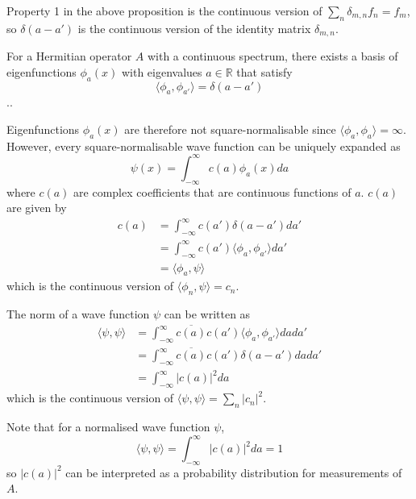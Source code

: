 \begin{remark}
	Property 1 in the above proposition is the continuous version of $\sum_n \delta_{m, n} f_n = f_m$, so $\delta(a - a')$ is the continuous version of the identity matrix $\delta_{m, n}$.
\end{remark}

\begin{proposition}
	For a Hermitian operator $A$ with a continuous spectrum, there exists a basis of eigenfunctions $\phi_a(x)$ with eigenvalues $a \in \mathbb{R}$ that satisfy
	\[
		\langle \phi_a, \phi_{a'} \rangle = \delta(a - a')
	\]..
\end{proposition}

\begin{corollary}
	Eigenfunctions $\phi_a(x)$ are therefore not square-normalisable since $\langle \phi_a, \phi_a \rangle = \infty$. However, every square-normalisable wave function can be uniquely expanded as
	\[
		\psi(x) = \int_{-\infty}^{\infty} c(a) \phi_a(x) da
	\]
	where $c(a)$ are complex coefficients that are continuous functions of $a$. $c(a)$ are given by
	\[
		\begin{aligned}
			c(a)
				& = \int_{-\infty}^{\infty} c(a') \delta(a - a') da' \\
				& = \int_{-\infty}^{\infty} c(a') \langle \phi_a, \phi_{a'} \rangle da' \\
				& = \langle \phi_a, \psi \rangle
		\end{aligned}
	\]
	which is the continuous version of $\langle \phi_n, \psi \rangle = c_n$.
\end{corollary}

\begin{corollary}
	The norm of a wave function $\psi$ can be written as
	\[
		\begin{aligned}
			\langle \psi, \psi \rangle
				& = \int_{-\infty}^{\infty} \overline{c(a)} c(a') \langle \phi_a, \phi_{a'} \rangle da da' \\
				& = \int_{-\infty}^{\infty} \overline{c(a)} c(a') \delta(a - a') da da' \\
				& = \int_{-\infty}^{\infty} |c(a)|^2 da
		\end{aligned}
	\]
	which is the continuous version of $\langle \psi, \psi \rangle = \sum_n |c_n|^2$.

	Note that for a normalised wave function $\psi$,
	\[
		\langle \psi, \psi \rangle = \int_{-\infty}^{\infty} |c(a)|^2 da = 1
	\]
	so $|c(a)|^2$ can be interpreted as a probability distribution for measurements of $A$.
\end{corollary}

